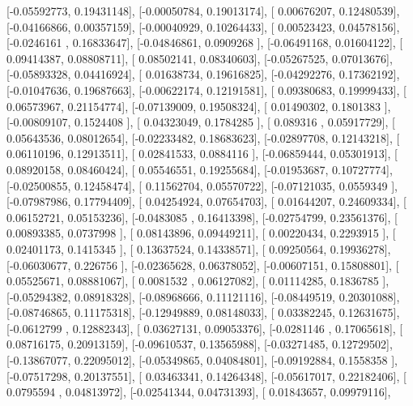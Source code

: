 \documentclass{article}
\begin{document}
       [-0.05592773,  0.19431148],
       [-0.00050784,  0.19013174],
       [ 0.00676207,  0.12480539],
       [-0.04166866,  0.00357159],
       [-0.00040929,  0.10264433],
       [ 0.00523423,  0.04578156],
       [-0.0246161 ,  0.16833647],
       [-0.04846861,  0.0909268 ],
       [-0.06491168,  0.01604122],
       [ 0.09414387,  0.08808711],
       [ 0.08502141,  0.08340603],
       [-0.05267525,  0.07013676],
       [-0.05893328,  0.04416924],
       [ 0.01638734,  0.19616825],
       [-0.04292276,  0.17362192],
       [-0.01047636,  0.19687663],
       [-0.00622174,  0.12191581],
       [ 0.09380683,  0.19999433],
       [ 0.06573967,  0.21154774],
       [-0.07139009,  0.19508324],
       [ 0.01490302,  0.1801383 ],
       [-0.00809107,  0.1524408 ],
       [ 0.04323049,  0.1784285 ],
       [ 0.089316  ,  0.05917729],
       [ 0.05643536,  0.08012654],
       [-0.02233482,  0.18683623],
       [-0.02897708,  0.12143218],
       [ 0.06110196,  0.12913511],
       [ 0.02841533,  0.0884116 ],
       [-0.06859444,  0.05301913],
       [ 0.08920158,  0.08460424],
       [ 0.05546551,  0.19255684],
       [-0.01953687,  0.10727774],
       [-0.02500855,  0.12458474],
       [ 0.11562704,  0.05570722],
       [-0.07121035,  0.0559349 ],
       [-0.07987986,  0.17794409],
       [ 0.04254924,  0.07654703],
       [ 0.01644207,  0.24609334],
       [ 0.06152721,  0.05153236],
       [-0.0483085 ,  0.16413398],
       [-0.02754799,  0.23561376],
       [ 0.00893385,  0.0737998 ],
       [ 0.08143896,  0.09449211],
       [ 0.00220434,  0.2293915 ],
       [ 0.02401173,  0.1415345 ],
       [ 0.13637524,  0.14338571],
       [ 0.09250564,  0.19936278],
       [-0.06030677,  0.226756  ],
       [-0.02365628,  0.06378052],
       [-0.00607151,  0.15808801],
       [ 0.05525671,  0.08881067],
       [ 0.0081532 ,  0.06127082],
       [ 0.01114285,  0.1836785 ],
       [-0.05294382,  0.08918328],
       [-0.08968666,  0.11121116],
       [-0.08449519,  0.20301088],
       [-0.08746865,  0.11175318],
       [-0.12949889,  0.08148033],
       [ 0.03382245,  0.12631675],
       [-0.0612799 ,  0.12882343],
       [ 0.03627131,  0.09053376],
       [-0.0281146 ,  0.17065618],
       [ 0.08716175,  0.20913159],
       [-0.09610537,  0.13565988],
       [-0.03271485,  0.12729502],
       [-0.13867077,  0.22095012],
       [-0.05349865,  0.04084801],
       [-0.09192884,  0.1558358 ],
       [-0.07517298,  0.20137551],
       [ 0.03463341,  0.14264348],
       [-0.05617017,  0.22182406],
       [ 0.0795594 ,  0.04813972],
       [-0.02541344,  0.04731393],
       [ 0.01843657,  0.09979116],
\end{document}
